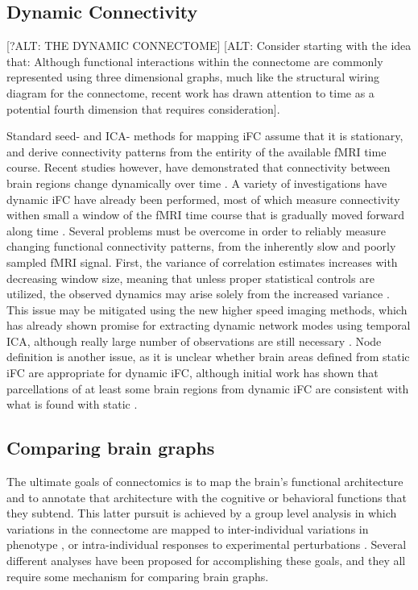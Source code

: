\subsection{Dynamic Connectivity} [?ALT: THE DYNAMIC CONNECTOME]
[ALT: Consider starting with the idea that: Although functional interactions within the connectome are commonly represented using three dimensional graphs, much like the structural wiring diagram for the connectome, recent work has drawn attention to time as a potential fourth dimension that requires consideration].

Standard seed- and ICA- methods for mapping iFC assume that it is stationary,
and derive connectivity patterns from the entirity of the available fMRI time
course. Recent studies however, have demonstrated that connectivity between
brain regions change dynamically over time \cite{Chang, Keilholz,
Hutchinson2013, Fu2013, Zhen}. A variety of investigations have dynamic iFC have
already been performed, most of which measure connectivity withen small a
window of the fMRI time course that is gradually moved forward along time
\cite{}. Several problems must be overcome in order to reliably measure
changing functional connectivity patterns, from the inherently slow and poorly
sampled fMRI signal. First, the variance of correlation estimates increases
with decreasing window size, meaning that unless proper statistical controls
are utilized, the observed dynamics may arise solely from the increased
variance \cite{}. This issue may be mitigated using the new higher speed
imaging methods, which has already shown promise for extracting dynamic network
modes using temporal ICA, although really large number of observations are
still necessary \cite{Smith2012}. Node definition is another
issue, as it is unclear whether brain areas defined from static iFC are
appropriate for dynamic iFC, although initial work has shown that parcellations
of at least some brain regions from dynamic iFC are consistent with what is
found with static \cite{Yang2013}.

\subsection{Comparing brain graphs} 

The ultimate goals of connectomics is to map the brain's functional
architecture and to annotate that architecture with the cognitive or behavioral
functions that they subtend. This latter pursuit is achieved by a group level
analysis in which variations in the connectome are mapped to inter-individual
variations in phenotype \cite{Kelly2011}, or intra-individual responses to
experimental perturbations \cite{Shirer}. Several different analyses have been
proposed for accomplishing these goals, and they all require some mechanism for
comparing brain graphs. 
 
